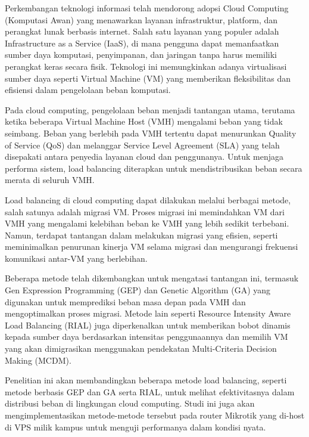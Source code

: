 Perkembangan teknologi informasi telah mendorong adopsi Cloud Computing (Komputasi Awan) yang menawarkan layanan infrastruktur, platform, dan perangkat lunak berbasis internet. Salah satu layanan yang populer adalah Infrastructure as a Service (IaaS), di mana pengguna dapat memanfaatkan sumber daya komputasi, penyimpanan, dan jaringan tanpa harus memiliki perangkat keras secara fisik. Teknologi ini memungkinkan adanya virtualisasi sumber daya seperti Virtual Machine (VM) yang memberikan fleksibilitas dan efisiensi dalam pengelolaan beban komputasi.

Pada cloud computing, pengelolaan beban menjadi tantangan utama, terutama ketika beberapa Virtual Machine Host (VMH) mengalami beban yang tidak seimbang. Beban yang berlebih pada VMH tertentu dapat menurunkan Quality of Service (QoS) dan melanggar Service Level Agreement (SLA) yang telah disepakati antara penyedia layanan cloud dan penggunanya. Untuk menjaga performa sistem, load balancing diterapkan untuk mendistribusikan beban secara merata di seluruh VMH.

Load balancing di cloud computing dapat dilakukan melalui berbagai metode, salah satunya adalah migrasi VM. Proses migrasi ini memindahkan VM dari VMH yang mengalami kelebihan beban ke VMH yang lebih sedikit terbebani. Namun, terdapat tantangan dalam melakukan migrasi yang efisien, seperti meminimalkan penurunan kinerja VM selama migrasi dan mengurangi frekuensi komunikasi antar-VM yang berlebihan.

Beberapa metode telah dikembangkan untuk mengatasi tantangan ini, termasuk Gen Expression Programming (GEP) dan Genetic Algorithm (GA) yang digunakan untuk memprediksi beban masa depan pada VMH dan mengoptimalkan proses migrasi. Metode lain seperti Resource Intensity Aware Load Balancing (RIAL) juga diperkenalkan untuk memberikan bobot dinamis kepada sumber daya berdasarkan intensitas penggunaannya dan memilih VM yang akan dimigrasikan menggunakan pendekatan Multi-Criteria Decision Making (MCDM).

Penelitian ini akan membandingkan beberapa metode load balancing, seperti metode berbasis GEP dan GA serta RIAL, untuk melihat efektivitasnya dalam distribusi beban di lingkungan cloud computing. Studi ini juga akan mengimplementasikan metode-metode tersebut pada router Mikrotik yang di-host di VPS milik kampus untuk menguji performanya dalam kondisi nyata. 
